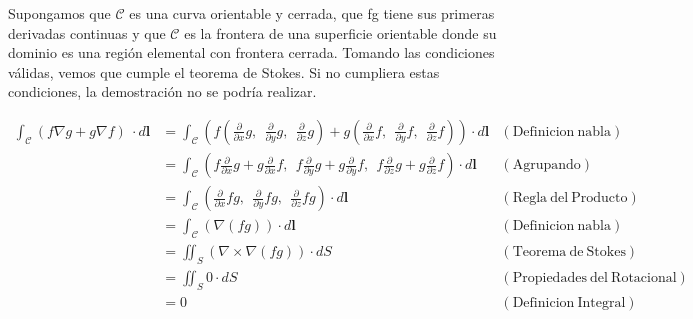 \documentclass{article}
\begin{document}
\begin{enumerate}
{            \color{azul}
            
            Supongamos que $\mathcal{C}$ es una curva orientable y cerrada, que fg tiene sus primeras derivadas continuas y que $\mathcal{C}$ es la frontera de una superficie orientable donde su dominio es una región elemental con frontera cerrada. Tomando las condiciones válidas, vemos que cumple el teorema de Stokes. Si no cumpliera estas condiciones, la demostración no se podría realizar.
                    
            \begin{align*}
                \int_{\mathcal{C}} {{\left(f \nabla g + g \nabla f\right)}\ \cdot d\mathbf{l}}
				&= \int_{\mathcal{C}} \left(f \left(\frac{\partial}{\partial x} g,\ \ \frac{\partial}{\partial y}g,\ \ \frac{\partial}{\partial z}g\right) + g \left(\frac{\partial}{\partial x} f,\ \ \frac{\partial}{\partial y}f,\ \ \frac{\partial}{\partial z}f\right)\right) \cdot d\mathbf{l} &\mathrm{(Definicion \ nabla)}\\  
				&=\int_{\mathcal{C}}\left(f\frac{\partial}{\partial x} g + g\frac{\partial}{\partial x} f ,\ \ f \frac{\partial}{\partial y} g + g\frac{\partial}{\partial y} f ,\ \ f \frac{\partial}{\partial z} g + g \frac{\partial}{\partial z} f \right) \cdot d\mathbf{l} & \mathrm{(Agrupando)}\\              
                &= \int_{\mathcal{C}}\left(\frac{\partial}{\partial x} fg,\ \ \frac{\partial}{\partial y}fg,\ \ \frac{\partial}{\partial z}fg\right) \cdot d\mathbf{l} &\mathrm{(Regla \ del \  Producto)}\\
&=\int_{\mathcal{C}}(\nabla(fg)) \cdot d\mathbf{l} &\mathrm{(Definicion \ nabla)}\\
&=\iint_{S} (\nabla \times \nabla(fg)) \cdot dS &\mathrm{(Teorema \ de \ Stokes)}\\
&=\iint_{S} 0 \cdot dS &\mathrm{(Propiedades \ del \ Rotacional)}\\
&= 0 &\mathrm{(Definicion \ Integral)}
            \end{align*}
            
            

        }
    \end{enumerate}
\end{document}
